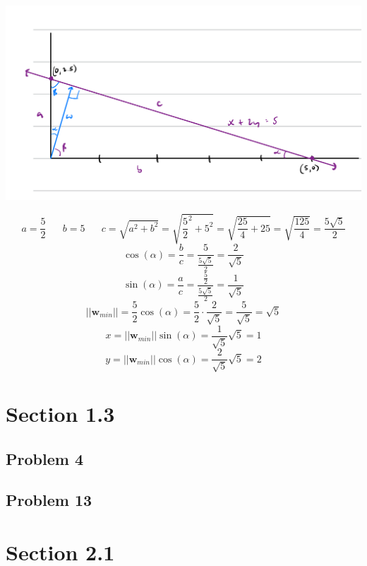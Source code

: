 \documentclass[12pt]{article}
\begin{document}
\includegraphics[scale=0.25]{s12p28b.png}

\[a = \frac{5}{2} \; \; \; \; \; \; b = 5 \; \; \; \; \; \; c = \sqrt{a^2 + b^2} 
    = \sqrt{\frac{5}{2}^2 + 5^2} 
    = \sqrt{\frac{25}{4} + 25}
    = \sqrt{\frac{125}{4}}
    = \frac{5\sqrt{5}}{2}
\]
\[
    \cos(\alpha) = \frac{b}{c} 
    = \frac{5}{\frac{5\sqrt{5}}{2}}
    = \frac{2}{\sqrt{5}}
\] 
\[ 
    \sin(\alpha) = \frac{a}{c}
    = \frac{\frac{5}{2}}{\frac{5\sqrt{5}}{2}}
    = \frac{1}{\sqrt{5}}
\]
\[
    \vert \vert \boldsymbol{w}_{min} \vert \vert 
    = \frac{5}{2} \cos(\alpha) 
    = \frac{5}{2} \cdot \frac{2}{\sqrt{5}} 
    = \frac{5}{\sqrt{5}} = \sqrt{5}
\]
\[ 
    x = \vert \vert \boldsymbol{w}_{min} \vert \vert  \sin(\alpha)
    = \frac{1}{\sqrt{5}} \sqrt{5} = 1
\]
\[
    y = \vert \vert \boldsymbol{w}_{min} \vert \vert  \cos(\alpha)
    = \frac{2}{\sqrt{5}} \sqrt{5} = 2
\]

\section*{Section 1.3}

\subsection*{Problem 4}

\subsection*{Problem 13}


\section*{Section 2.1}
\end{document}
